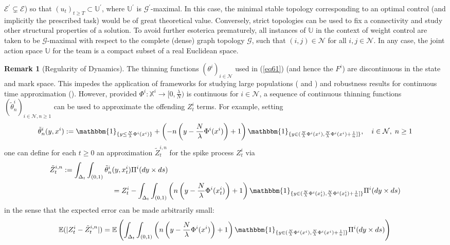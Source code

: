 \documentclass[12pt, oneside]{report}
\newcommand{\E}{\mathbb{E}}
\newcommand{\mbb}[1]{\mathbb{#1}}
\newcommand{\1}[1]{\mathbbm{1}_{\{#1\}}}
\newcommand{\mc}[1]{\mathcal{#1}}
\theoremstyle{definition}
\newtheorem{remark}[theorem]{Remark}
\begin{document}
$\mc{E}^\prime\subsetneq\mc{E}$) so that $(u_t)_{t\geq T}\subset\mbb{U}^\prime$,
where $\mbb{U}^\prime$ is $\mc{G}^\prime$-maximal. In this case, the minimal
stable topology corresponding to an optimal control (and implicitly the
prescribed task) would be of great theoretical value. Conversely, strict
topologies can be used to fix a connectivity and study other structural
properties of a solution. To avoid further esoterica prematurely, all instances
of $\mbb{U}$ in the context of weight control are taken to be $\mc{G}$-maximal
with respect to the complete (dense) graph topology $\mc{G}$, such that $(i,j)\in\mc{N}$ for all $i,j\in\mc{N}$.
In any case, the joint action space $\mbb{U}$ for the team is a compact subset of a real Euclidean space.
\begin{remark}[Regularity of Dynamics]\label{rem1}
    The thinning functions $(\theta^i)_{i\in\mc{N}}$ used in (\ref{eq61}) (and hence the $F^i$) are discontinuous in the state and mark space. This impedes the application of frameworks for studying
    large populations (\cite[assumption 3]{Bauerle_2023} and \cite[assumption 2.5.i]{Sanjari_Saldi_Yüksel_2023}) and robustness results for continuous time approximation (\cite[assumption 2.2]{Kushner_2000}).
    However, provided $\Phi^i:\mbb{X}^i\rightarrow[0,\frac{\lambda}{N})$ is continuous for $i\in\mc{N}$, a sequence of continuous thinning functions $(\tilde{\theta}^i_n)_{i\in\mc{N},n\geq 1}$ can be used
    to approximate the offending $Z^i_t$ terms. For example, setting
    \begin{align}
        \tilde{\theta}_n^i(y,x^i):=\1{y\leq \frac{N}{\lambda}\Phi^i(x^i)}+\left(-n\left(y-\frac{N}{\lambda}\Phi^i(x^i)\right)+1\right)\1{y\in(\frac{N}{\lambda}\Phi^i(x^i),\frac{N}{\lambda}\Phi^i(x^i)+\frac{1}{n}]},\quad i\in\mc{N},\;n\geq 1
    \end{align}
    one can define for each $t\geq 0$ an approximation $\tilde{Z}^{i,n}_t$ for the spike process $Z^i_t$ via
    \begin{align}
        \tilde{Z}^{i,n}_t:=\int_{\Delta_t}\int_{(0,1)}\tilde{\theta}^i_n&(y,x^i_t)\Pi^i(dy\times ds)\\
        &=Z^i_t-\int_{\Delta_t}\int_{(0,1)}\left(n\left(y-\frac{N}{\lambda}\Phi^i(x^i_t)\right)+1\right)\1{y\in(\frac{N}{\lambda}\Phi^i(x^i_t),\frac{N}{\lambda}\Phi^i(x^i_t)+\frac{1}{n}]}\Pi^i(dy\times ds)
    \end{align}
    in the sense that the expected error can be made arbitrarily small:
    \begin{align}
        \E(|Z^i_t-\tilde{Z}^{i,n}_t|)&=\E\left(\int_{\Delta_t}\int_{(0,1)}\left(n\left(y-\frac{N}{\lambda}\Phi^i(x^i)\right)+1\right)\1{y\in(\frac{N}{\lambda}\Phi^i(x^i),\frac{N}{\lambda}\Phi^i(x^i)+\frac{1}{n}]}\Pi^i(dy\times ds)\right)\notag{}\\

\end{align}
\end{remark}
\end{document}
